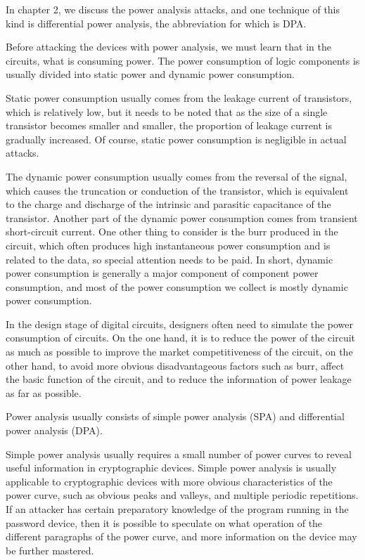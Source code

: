 \begin{bigabstract}
In chapter 2, we discuss the power analysis attacks, and one technique of this kind is differential power analysis, the abbreviation for which is DPA. 

Before attacking the devices with power analysis, we must learn that in the circuits, what is consuming power. The power consumption of logic components is usually divided into static power and dynamic power consumption.

Static power consumption usually comes from the leakage current of transistors, which is relatively low, but it needs to be noted that as the size of a single transistor becomes smaller and smaller, the proportion of leakage current is gradually increased. Of course, static power consumption is negligible in actual attacks.

The dynamic power consumption usually comes from the reversal of the signal, which causes the truncation or conduction of the transistor, which is equivalent to the charge and discharge of the intrinsic and parasitic capacitance of the transistor. Another part of the dynamic power consumption comes from transient short-circuit current. One other thing to consider is the burr produced in the circuit, which often produces high instantaneous power consumption and is related to the data, so special attention needs to be paid. In short, dynamic power consumption is generally a major component of component power consumption, and most of the power consumption we collect is mostly dynamic power consumption.

In the design stage of digital circuits, designers often need to simulate the power consumption of circuits. On the one hand, it is to reduce the power of the circuit as much as possible to improve the market competitiveness of the circuit, on the other hand, to avoid more obvious disadvantageous factors such as burr, affect the basic function of the circuit, and to reduce the information of power leakage as far as possible.

Power analysis usually consists of simple power analysis (SPA) and differential power analysis (DPA).

Simple power analysis usually requires a small number of power curves to reveal useful information in cryptographic devices. Simple power analysis is usually applicable to cryptographic devices with more obvious characteristics of the power curve, such as obvious peaks and valleys, and multiple periodic repetitions. If an attacker has certain preparatory knowledge of the program running in the password device, then it is possible to speculate on what operation of the different paragraphs of the power curve, and more information on the device may be further mastered.


\end{bigabstract}
